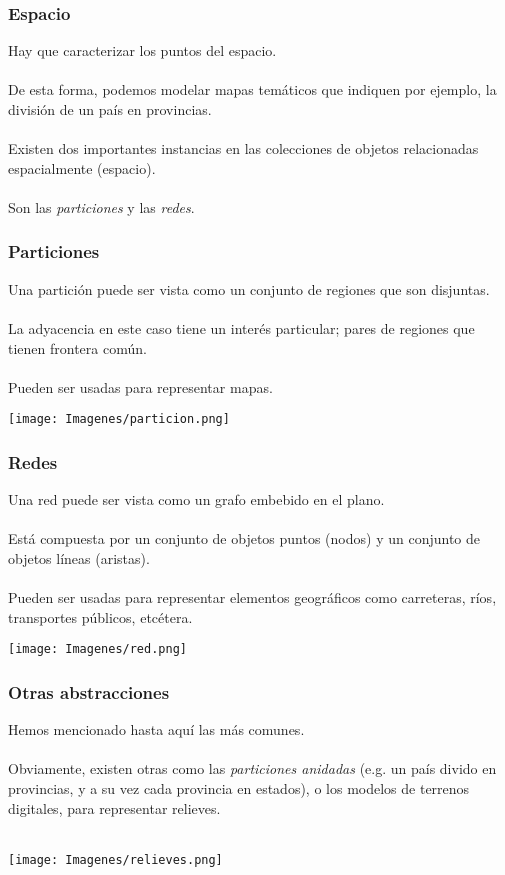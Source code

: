 \documentclass[12pt]{beamer}
\begin{document}
\begin{frame}
\frametitle{Espacio}
Hay que caracterizar los puntos del espacio.\\
\ \\
De esta forma, podemos modelar mapas tem\'aticos que indiquen por ejemplo, la divisi\'on de un pa\'is en provincias.\\
\ \\
Existen dos importantes instancias en las colecciones de objetos relacionadas espacialmente (espacio).\\
\ \\
Son las \textit{particiones} y las \textit{redes}.\\
\end{frame}

\begin{frame}
\frametitle{Particiones}
Una partici\'on puede ser vista como un conjunto de regiones que son disjuntas.\\
\ \\
La adyacencia en este caso tiene un inter\'es particular; pares de regiones que tienen frontera com\'un.\\
\ \\
Pueden ser usadas para representar mapas.
\ \\
\begin{center}\texttt{[image: Imagenes/particion.png]}
\end{center}
\end{frame}

\begin{frame}
\frametitle{Redes}
Una red puede ser vista como un grafo embebido en el plano.\\
\ \\
Est\'a compuesta por un conjunto de objetos puntos (nodos) y un conjunto de objetos l\'ineas (aristas).\\
\ \\
Pueden ser usadas para representar elementos geogr\'aficos como carreteras, r\'ios, transportes p\'ublicos, etc\'etera.
\ \\
\begin{center}\texttt{[image: Imagenes/red.png]}
\end{center}
\end{frame}

\begin{frame}
\frametitle{Otras abstracciones}
Hemos mencionado hasta aqu\'i las m\'as comunes.\\
\ \\
Obviamente, existen otras como las \textit{particiones anidadas} (e.g. un pa\'is divido en provincias, y a su vez cada provincia en estados), o los modelos de terrenos digitales, para representar relieves.\\
\ \\
\begin{center}\texttt{[image: Imagenes/relieves.png]}
\end{center}
\end{frame}
\end{document}
